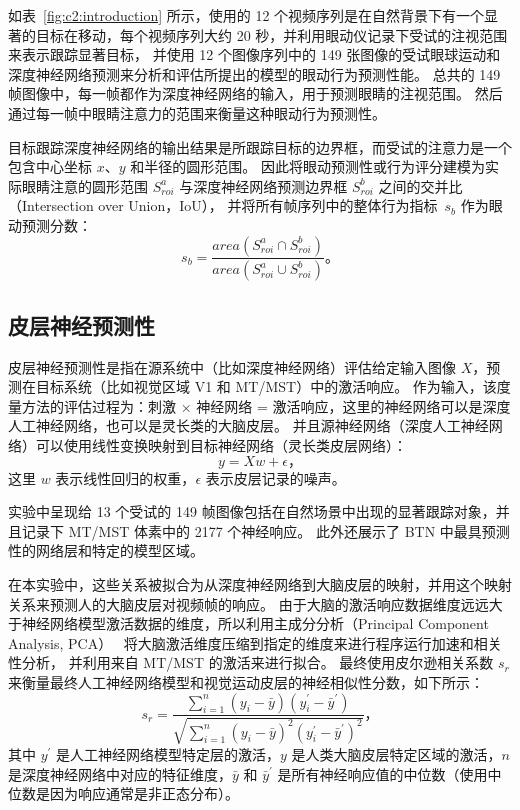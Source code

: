 如表~\ref{fig:c2:introduction} 所示，使用的 12 个视频序列是在自然背景下有一个显著的目标在移动，每个视频序列大约 20 秒，并利用眼动仪记录下受试的注视范围来表示跟踪显著目标，
并使用 12 个图像序列中的 149 张图像的受试眼球运动和深度神经网络预测来分析和评估所提出的模型的眼动行为预测性能。
总共的 149 帧图像中，每一帧都作为深度神经网络的输入，用于预测眼睛的注视范围。
然后通过每一帧中眼睛注意力的范围来衡量这种眼动行为预测性。

目标跟踪深度神经网络的输出结果是所跟踪目标的边界框，而受试的注意力是一个包含中心坐标 $x$、$y$ 和半径的圆形范围。
因此将眼动预测性或行为评分建模为实际眼睛注意的圆形范围 $S_{roi}^a$ 与深度神经网络预测边界框 $S_{roi}^b$ 之间的交并比（Intersection over Union，IoU），
并将所有帧序列中的整体行为指标~$s_b$ 作为眼动预测分数：
\begin{equation}
s_b=\frac{area(S_{roi}^a \cap S_{roi}^b) }  { area(S_{roi}^a \cup S_{roi}^b) } \mbox{。}
\end{equation}


\subsection{皮层神经预测性}
皮层神经预测性是指在源系统中（比如深度神经网络）评估给定输入图像 $X$，预测在目标系统（比如视觉区域 V1 和 MT/MST）中的激活响应。
作为输入，该度量方法的评估过程为：刺激 $\times$ 神经网络 = 激活响应，这里的神经网络可以是深度人工神经网络，也可以是灵长类的大脑皮层。
并且源神经网络（深度人工神经网络）可以使用线性变换映射到目标神经网络（灵长类皮层网络）：
\begin{equation}
y = Xw + \epsilon \mbox{，}
\end{equation}
这里 $w$ 表示线性回归的权重，$\epsilon$ 表示皮层记录的噪声。

实验中呈现给 13 个受试的 149 帧图像包括在自然场景中出现的显著跟踪对象，并且记录下 MT/MST 体素中的 2177 个神经响应。
此外还展示了 BTN 中最具预测性的网络层和特定的模型区域。

在本实验中，这些关系被拟合为从深度神经网络到大脑皮层的映射，并用这个映射关系来预测人的大脑皮层对视频帧的响应。
由于大脑的激活响应数据维度远远大于神经网络模型激活数据的维度，所以利用主成分分析（Principal Component Analysis, PCA）~\cite{2002Principal} 将大脑激活维度压缩到指定的维度来进行程序运行加速和相关性分析，
并利用来自 MT/MST 的激活来进行拟合。 
最终使用皮尔逊相关系数 $s_r$ 来衡量最终人工神经网络模型和视觉运动皮层的神经相似性分数，如下所示：
\begin{equation}
s_r=\frac{\sum_{i=1}^{n} (y_i-\bar{y}) (y_i^\prime - \bar{y}^\prime) }{\sqrt{\sum_{i=1}^{n} (y_i - \bar{y})^2 (y_i^\prime - \bar{y}^\prime)^2 }}\mbox{，}
\end{equation}
其中 $y^\prime$ 是人工神经网络模型特定层的激活，$y$ 是人类大脑皮层特定区域的激活，$n$ 是深度神经网络中对应的特征维度，$\bar{y}$ 和 $\bar{y}^\prime$ 是所有神经响应值的中位数（使用中位数是因为响应通常是非正态分布）。

